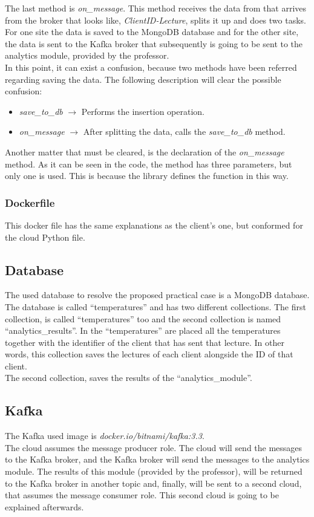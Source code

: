 \documentclass[a4paper,12pt]{article}
\begin{document}
The last method is \textit{on\_message}. This method receives the data from that arrives from the broker that looks like, \textit{ClientID-Lecture}, splits it up and does two tasks. For one site the data is saved to the MongoDB database and for the other site, the data is sent to the Kafka broker that subsequently is going to be sent to the analytics module, provided by the professor.\\
In this point, it can exist a confusion, because two methods have been referred regarding saving the data. The following description will clear the possible confusion:
\begin{itemize}
    \item \textit{save\_to\_db} $\longrightarrow$ Performs the insertion operation.
    \item \textit{on\_message} $\longrightarrow$ After splitting the data, calls the \textit{save\_to\_db} method.
\end{itemize}
Another matter that must be cleared, is the declaration of the \textit{on\_message} method. As it can be seen in the code, the method has three parameters, but only one is used. This is because the library defines the function in this way.

\subsubsection*{Dockerfile}
This docker file has the same explanations as the client's one, but conformed for the cloud Python file.

\subsection*{Database}
The used database to resolve the proposed practical case is a MongoDB database.\\
The database is called “temperatures” and has two different collections. The first collection, is called “temperatures” too and the second collection is named “analytics\_results”. In the “temperatures” are placed all the temperatures together with the identifier of the client that has sent that lecture. In other words, this collection saves the lectures of each client alongside the ID of that client.\\
The second collection, saves the results of the “analytics\_module”.

\subsection*{Kafka}
The Kafka used image is \textit{docker.io/bitnami/kafka:3.3}.\\
The cloud assumes the message producer role. The cloud will send the messages to the Kafka broker, and the Kafka broker will send the messages to the analytics module. The results of this module (provided by the professor), will be returned to the Kafka broker in another topic and, finally, will be sent to a second cloud, that assumes the message consumer role. This second cloud is going to be explained afterwards.
\end{document}
